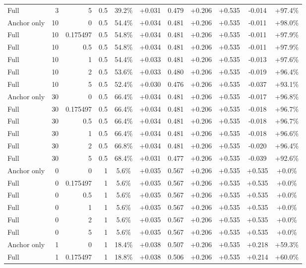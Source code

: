 \begin{table}[htbp]
\begin{tabular}{lrrrccccccc}
Full & 3 & 5 & 0.5 & 39.2\% & +0.031 & 0.479 & +0.206 & +0.535 & -0.014 & +97.4\% \\
Anchor only & 10 & 0 & 0.5 & 54.4\% & +0.034 & 0.481 & +0.206 & +0.535 & -0.011 & +98.0\% \\
Full & 10 & 0.175497 & 0.5 & 54.8\% & +0.034 & 0.481 & +0.206 & +0.535 & -0.011 & +97.9\% \\
Full & 10 & 0.5 & 0.5 & 54.8\% & +0.034 & 0.481 & +0.206 & +0.535 & -0.011 & +97.9\% \\
Full & 10 & 1 & 0.5 & 54.4\% & +0.033 & 0.481 & +0.206 & +0.535 & -0.013 & +97.6\% \\
Full & 10 & 2 & 0.5 & 53.6\% & +0.033 & 0.480 & +0.206 & +0.535 & -0.019 & +96.4\% \\
Full & 10 & 5 & 0.5 & 52.4\% & +0.030 & 0.476 & +0.206 & +0.535 & -0.037 & +93.1\% \\
Anchor only & 30 & 0 & 0.5 & 66.4\% & +0.034 & 0.481 & +0.206 & +0.535 & -0.017 & +96.8\% \\
Full & 30 & 0.175497 & 0.5 & 66.4\% & +0.034 & 0.481 & +0.206 & +0.535 & -0.018 & +96.7\% \\
Full & 30 & 0.5 & 0.5 & 66.4\% & +0.034 & 0.481 & +0.206 & +0.535 & -0.018 & +96.7\% \\
Full & 30 & 1 & 0.5 & 66.4\% & +0.034 & 0.481 & +0.206 & +0.535 & -0.018 & +96.6\% \\
Full & 30 & 2 & 0.5 & 66.8\% & +0.034 & 0.481 & +0.206 & +0.535 & -0.020 & +96.4\% \\
Full & 30 & 5 & 0.5 & 68.4\% & +0.031 & 0.477 & +0.206 & +0.535 & -0.039 & +92.6\% \\
Anchor only & 0 & 0 & 1 & 5.6\% & +0.035 & 0.567 & +0.206 & +0.535 & +0.535 & +0.0\% \\
Full & 0 & 0.175497 & 1 & 5.6\% & +0.035 & 0.567 & +0.206 & +0.535 & +0.535 & +0.0\% \\
Full & 0 & 0.5 & 1 & 5.6\% & +0.035 & 0.567 & +0.206 & +0.535 & +0.535 & +0.0\% \\
Full & 0 & 1 & 1 & 5.6\% & +0.035 & 0.567 & +0.206 & +0.535 & +0.535 & +0.0\% \\
Full & 0 & 2 & 1 & 5.6\% & +0.035 & 0.567 & +0.206 & +0.535 & +0.535 & +0.0\% \\
Full & 0 & 5 & 1 & 5.6\% & +0.035 & 0.567 & +0.206 & +0.535 & +0.535 & +0.0\% \\
Anchor only & 1 & 0 & 1 & 18.4\% & +0.038 & 0.507 & +0.206 & +0.535 & +0.218 & +59.3\% \\
Full & 1 & 0.175497 & 1 & 18.8\% & +0.038 & 0.506 & +0.206 & +0.535 & +0.214 & +60.0\% \\

\end{tabular}
\end{table}
